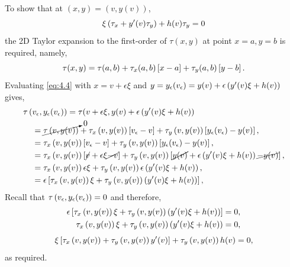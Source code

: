 To show that at $(x,y) = (v,y(v))$,
\[\xi\left(\tau_x+y^\prime(v)\tau_y\right)+h(v)\tau_y=0\]
the 2D Taylor expansion to the first-order of $\tau(x,y)$ at point $x=a, y=b$ is required, namely,
\begin{equation}
\label{eq:4.4}
\tau(x,y) = \tau(a,b) + \tau_x(a,b)\left[x-a\right] + \tau_y(a,b)\left[y-b\right].
\end{equation}
Evaluating \eqref{eq:4.4} with $x=v + \epsilon\xi$ and $y=y_\epsilon(v_\epsilon)=y(v) + \epsilon\left(y^\prime(v)\xi+h(v)\right)$ gives,
\begin{equation*}
\begin{split}
\tau&\left(v_\epsilon,y_\epsilon(v_\epsilon)\right) = \tau(v+\epsilon\xi,y(v)+\epsilon\left(y^\prime(v)\xi+h(v)\right)\\
&\;\;= \cancelto{0}{\tau\left(v,y(v)\right)} + \tau_x\left(v,y(v)\right)\left[v_\epsilon-v\right]+\tau_y\left(v,y(v)\right)\left[y_\epsilon(v_\epsilon)-y(v)\right],\\
&\;\;= \tau_x\left(v,y(v)\right)\left[v_\epsilon-v\right]+\tau_y\left(v,y(v)\right)\left[y_\epsilon(v_\epsilon)-y(v)\right],\\
&\;\;= \tau_x\left(v,y(v)\right)\left[\cancel{v}+\epsilon\xi\cancel{-v}\right]+\tau_y\left(v,y(v)\right)\left[\cancel{y(v)} + \epsilon\left(y^\prime(v)\xi+h(v)\right)\cancel{-y(v)}\right],\\
&\;\;= \tau_x\left(v,y(v)\right)\epsilon\xi+\tau_y\left(v,y(v)\right)\epsilon\left(y^\prime(v)\xi+h(v)\right),\\
&\;\;= \epsilon\left[\tau_x\left(v,y(v)\right)\xi+\tau_y\left(v,y(v)\right)\left(y^\prime(v)\xi+h(v)\right)\right],\\
\end{split}
\end{equation*}
Recall that $\tau\left(v_\epsilon,y_\epsilon(v_\epsilon)\right) = 0$ and therefore,
\begin{equation*}
\begin{split}
	\epsilon\left[\tau_x\left(v,y(v)\right)\xi+\tau_y\left(v,y(v)\right)\left(y^\prime(v)\xi+h(v)\right)\right] &= 0,\\
	\tau_x\left(v,y(v)\right)\xi+\tau_y\left(v,y(v)\right)\left(y^\prime(v)\xi+h(v)\right) &= 0,\\
\end{split}
\end{equation*}
\begin{equation}
	\label{eq:4.5}
	\xi\left[\tau_x\left(v,y(v)\right) + \tau_y\left(v,y(v)\right) y^\prime(v)\right] + \tau_y\left(v,y(v)\right) h(v) = 0,
\end{equation}
as required.

